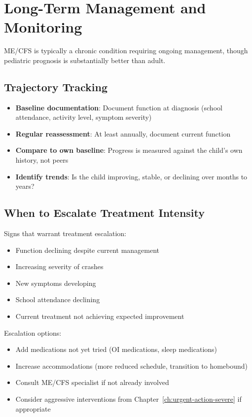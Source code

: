 \section{Long-Term Management and Monitoring}
\label{sec:ped-longterm}

ME/CFS is typically a chronic condition requiring ongoing management, though pediatric prognosis is substantially better than adult.

\subsection{Trajectory Tracking}

\begin{itemize}
    \item \textbf{Baseline documentation}: Document function at diagnosis (school attendance, activity level, symptom severity)
    \item \textbf{Regular reassessment}: At least annually, document current function
    \item \textbf{Compare to own baseline}: Progress is measured against the child's own history, not peers
    \item \textbf{Identify trends}: Is the child improving, stable, or declining over months to years?
\end{itemize}

\subsection{When to Escalate Treatment Intensity}

Signs that warrant treatment escalation:

\begin{itemize}
    \item Function declining despite current management
    \item Increasing severity of crashes
    \item New symptoms developing
    \item School attendance declining
    \item Current treatment not achieving expected improvement
\end{itemize}

Escalation options:
\begin{itemize}
    \item Add medications not yet tried (OI medications, sleep medications)
    \item Increase accommodations (more reduced schedule, transition to homebound)
    \item Consult ME/CFS specialist if not already involved
    \item Consider aggressive interventions from Chapter~\ref{ch:urgent-action-severe} if appropriate
\end{itemize}

